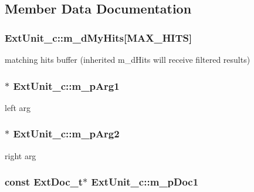 \subsection{Member Data Documentation}
\hypertarget{classExtUnit__c_ae8b27ce86563533dbc48728ef669de10}{
\subsubsection[{m\-\_\-d\-My\-Hits}]{ Ext\-Unit\-\_\-c\-::m\-\_\-d\-My\-Hits\mbox{[}{\bf M\-A\-X\-\_\-\-H\-I\-T\-S}\mbox{]}\hspace{0.3cm}{\ttfamily [private]}}}\label{classExtUnit__c_ae8b27ce86563533dbc48728ef669de10}


matching hits buffer (inherited m\-\_\-d\-Hits will receive filtered results) 

\hypertarget{classExtUnit__c_a26cac752b4ece78ea2cb78bb8ff572e0}{
\subsubsection[{m\-\_\-p\-Arg1}]{$\ast$ Ext\-Unit\-\_\-c\-::m\-\_\-p\-Arg1\hspace{0.3cm}{\ttfamily [private]}}}\label{classExtUnit__c_a26cac752b4ece78ea2cb78bb8ff572e0}


left arg 

\hypertarget{classExtUnit__c_a2326eb5df0ab47378ea39c51725206fe}{
\subsubsection[{m\-\_\-p\-Arg2}]{$\ast$ Ext\-Unit\-\_\-c\-::m\-\_\-p\-Arg2\hspace{0.3cm}{\ttfamily [private]}}}\label{classExtUnit__c_a2326eb5df0ab47378ea39c51725206fe}


right arg 

\hypertarget{classExtUnit__c_accbc2b53d43ba220a4edc3d54a75501c}{
\subsubsection[{m\-\_\-p\-Doc1}]{\setlength{\rightskip}{0pt plus 5cm}const {\bf Ext\-Doc\-\_\-t}$\ast$ Ext\-Unit\-\_\-c\-::m\-\_\-p\-Doc1\hspace{0.3cm}{\ttfamily [private]}}}\label{classExtUnit__c_accbc2b53d43ba220a4edc3d54a75501c}


